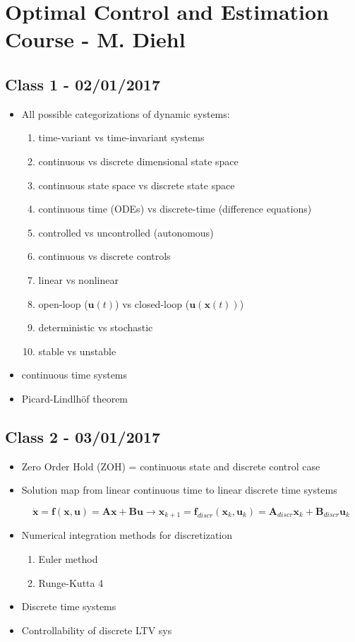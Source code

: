 \section{Optimal Control and Estimation Course - M. Diehl}

\subsection*{Class 1 - 02/01/2017}

\begin{itemize}
\item All possible categorizations of dynamic systems:
\begin{enumerate}
\item time-variant vs time-invariant systems
\item continuous vs discrete dimensional state space
\item continuous state space vs discrete state space
\item continuous time (ODEs) vs discrete-time (difference equations)
\item controlled vs uncontrolled (autonomous)
\item continuous vs discrete controls
\item linear vs nonlinear
\item open-loop ($\mathbf{u}(t)$) vs closed-loop
 ($\mathbf{u}(\mathbf{x}(t))$)
\item deterministic vs stochastic
\item stable vs unstable
\end{enumerate}
\item continuous time systems
\item Picard-Lindlh\"of theorem
\end{itemize}
\subsection*{Class 2 - 03/01/2017}

\begin{itemize}
\item Zero Order Hold (ZOH) = continuous state and discrete control case
\item Solution map from linear continuous time to linear discrete time systems

$$ \dot{\mathbf{x}} = \mathbf{f}(\mathbf{x}, \mathbf{u}) = \mathbf{A}\mathbf{x} + \mathbf{B}\mathbf{u} \rightarrow \mathbf{x}_{k+1} = \mathbf{f}_{discr}(\mathbf{x}_k, \mathbf{u}_k) = \mathbf{A}_{discr}\mathbf{x}_k + \mathbf{B}_{discr}\mathbf{u}_k$$
\item Numerical integration methods for discretization
\begin{enumerate}
\item Euler method
\item Runge-Kutta 4
\end{enumerate}
\item Discrete time systems
\item Controllability of discrete LTV sys
\end{itemize}

